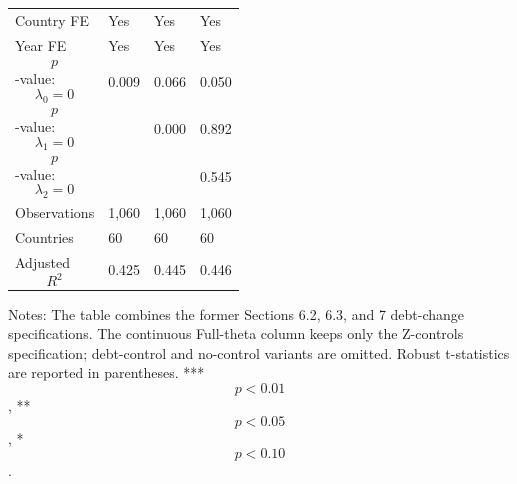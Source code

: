 \begin{table}[H]
\begin{threeparttable}
\begin{tabularx}{\textwidth}{lYYY}
Country FE & Yes & Yes & Yes \\
Year FE & Yes & Yes & Yes \\
$$p$$-value: $$\lambda_0=0$$ & 0.009 & 0.066 & 0.050 \\
$$p$$-value: $$\lambda_1=0$$ &  & 0.000 & 0.892 \\
$$p$$-value: $$\lambda_2=0$$ &  &  & 0.545 \\
Observations & 1,060 & 1,060 & 1,060 \\
Countries & 60 & 60 & 60 \\
Adjusted $$R^2$$ & 0.425 & 0.445 & 0.446 \\
\bottomrule
\end{tabularx}
\begin{tablenotes}[flushleft]\footnotesize
\item Notes: The table combines the former Sections 6.2, 6.3, and 7 debt-change specifications. The continuous Full-theta column keeps only the Z-controls specification; debt-control and no-control variants are omitted. Robust t-statistics are reported in parentheses. *** $$p<0.01$$, ** $$p<0.05$$, * $$p<0.10$$.
\end{tablenotes}
\end{threeparttable}
\end{table}
